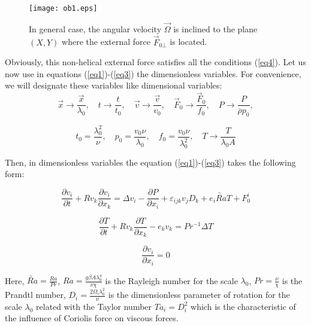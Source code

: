 \documentclass [12pt]{article}
\begin{document}
\begin{figure}
  \centering
    \texttt{[image: ob1.eps]}\\
  \caption{ In general case, the angular velocity $\vec{\Omega} $ is inclined to the plane $(X, Y)$ where the external force  $\vec{F}_{0\bot} $ is located.}\label{fg1}
\end{figure}


Obviously, this non-helical external force satisfies all the conditions (\ref{eq4}). Let us now use in equations (\ref{eq1})-(\ref{eq3}) the dimensionless variables.  For convenience, we will designate these variables like dimensional variables:
\[\vec{x}\to \frac{\vec{x}}{\lambda _{0} } , \quad t
\to \frac{t}{t_{0} } , \quad \vec{v}\to \frac{\vec{v}}{v_{0} }  , \quad \vec{F}_{0} \to \frac{
\vec{F}_{0} }{f_{0} } , \quad P\to \frac{P}{\overline{\rho }p_{0} } , \]

\begin{equation} \label{eq6}
  t_{0} =\frac{
\lambda _{0}^{2} }{\nu } , \quad p_{0} =\frac{v_{0} \nu }{\lambda _{0} } , \quad f_{0} =\frac{v_{0}
\nu }{\lambda _{0}^{2} } , \quad T\to \frac{T}{\lambda _{0} A}
\end{equation}

Then, in dimensionless variables the equation (\ref{eq1})-(\ref{eq3}) takes the following form:

\begin{equation} \label{eq7}
  \frac{\partial v_{i} }{\partial t} +Rv_{k} \frac{
\partial v_{i} }{\partial x_{k} } =\Delta v_{i} -\frac{\partial P}{\partial x_{i}
} +\varepsilon _{ijk} v_{j} D_{k} +e_{i}\widetilde{Ra}T+F_{0}^{i}
\end{equation}

\begin{equation} \label{eq8}
  \frac{\partial T}{\partial t} +Rv_{k} \frac{\partial T}{\partial
x_{k} } -e_{k} v_{k} =Pr^{-1} \Delta T
\end{equation}

\begin{equation} \label{eq9}
  \frac{\partial v_{i} }{\partial x_{i} } =0
\end{equation}

Here, $\widetilde{Ra}=\frac{Ra}{Pr} $, $Ra=\frac{g\beta A\lambda _{0}^{4} }{\nu \chi } $ is the Rayleigh number for the scale $\lambda _{0} $,  $Pr=\frac{\nu }{\chi } $  is the  Prandtl number, $D_{i} =\frac{2\Omega _{i} \lambda _{0}^{2} }{\nu } $ is the dimensionless parameter of rotation for the scale $\lambda _{0} $ related with the Taylor number  $Ta_{i} =D_{i}^{2} $ which is the characteristic  of  the influence of  Coriolis force on viscous forces.
\end{document}

